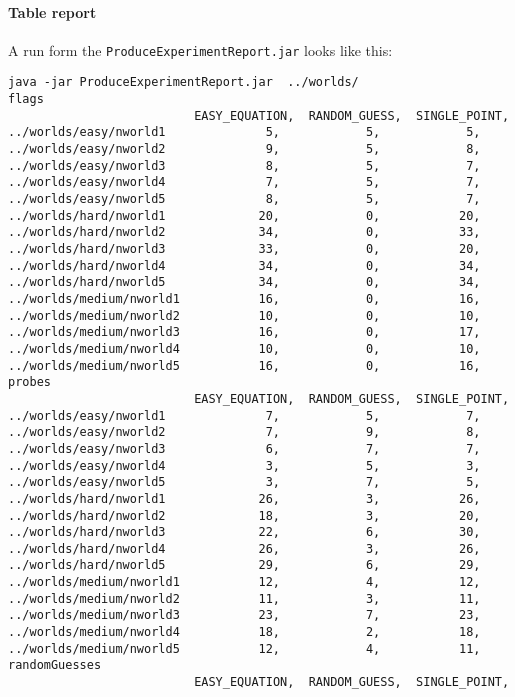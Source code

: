 \documentclass[british]{article}
\newcommand{\code}[1]{\texttt{#1}}
\begin{document}
\paragraph{Table report} A run form the \code{ProduceExperimentReport.jar} looks like this:
\begin{lstlisting}
java -jar ProduceExperimentReport.jar  ../worlds/
flags
                          EASY_EQUATION,  RANDOM_GUESS,  SINGLE_POINT,
../worlds/easy/nworld1              5,            5,            5,
../worlds/easy/nworld2              9,            5,            8,
../worlds/easy/nworld3              8,            5,            7,
../worlds/easy/nworld4              7,            5,            7,
../worlds/easy/nworld5              8,            5,            7,
../worlds/hard/nworld1             20,            0,           20,
../worlds/hard/nworld2             34,            0,           33,
../worlds/hard/nworld3             33,            0,           20,
../worlds/hard/nworld4             34,            0,           34,
../worlds/hard/nworld5             34,            0,           34,
../worlds/medium/nworld1           16,            0,           16,
../worlds/medium/nworld2           10,            0,           10,
../worlds/medium/nworld3           16,            0,           17,
../worlds/medium/nworld4           10,            0,           10,
../worlds/medium/nworld5           16,            0,           16,
probes
                          EASY_EQUATION,  RANDOM_GUESS,  SINGLE_POINT,
../worlds/easy/nworld1              7,            5,            7,
../worlds/easy/nworld2              7,            9,            8,
../worlds/easy/nworld3              6,            7,            7,
../worlds/easy/nworld4              3,            5,            3,
../worlds/easy/nworld5              3,            7,            5,
../worlds/hard/nworld1             26,            3,           26,
../worlds/hard/nworld2             18,            3,           20,
../worlds/hard/nworld3             22,            6,           30,
../worlds/hard/nworld4             26,            3,           26,
../worlds/hard/nworld5             29,            6,           29,
../worlds/medium/nworld1           12,            4,           12,
../worlds/medium/nworld2           11,            3,           11,
../worlds/medium/nworld3           23,            7,           23,
../worlds/medium/nworld4           18,            2,           18,
../worlds/medium/nworld5           12,            4,           11,
randomGuesses
                          EASY_EQUATION,  RANDOM_GUESS,  SINGLE_POINT,

\end{lstlisting}
\end{document}
